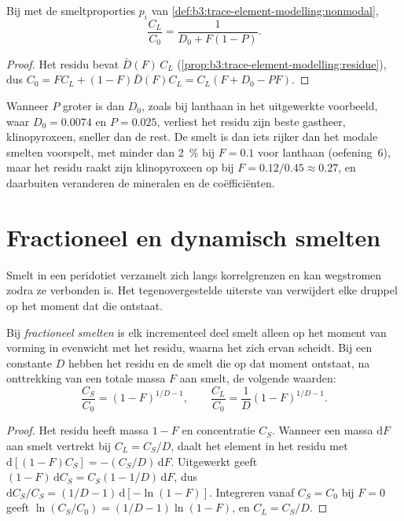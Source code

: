 \begin{proposition}\label{prop:b3:trace-element-modelling:nonmodal}
Bij  met de smeltproporties $p_i$ van \cref{def:b3:trace-element-modelling:nonmodal},
\[
\frac{C_L}{C_0} = \frac{1}{D_0 + F(1 - P)}.
\]
\end{proposition}

\begin{proof}
Het residu bevat $\bar D(F)\,C_L$ (\cref{prop:b3:trace-element-modelling:residue}),
dus $C_0 = FC_L + (1 - F)\bar D(F)C_L = C_L(F + D_0 - PF)$.
\end{proof}

Wanneer $P$ groter is dan $D_0$, zoals bij lanthaan in het uitgewerkte voorbeeld, waar $D_0 =
0.0074$ en $P = 0.025$, verliest het residu zijn beste gastheer, klinopyroxeen, sneller
dan de rest. De smelt is dan iets rijker dan het modale smelten voorspelt,
met minder dan \qty{2}{\percent} bij $F = 0.1$ voor lanthaan (oefening~6), maar het
residu raakt zijn klinopyroxeen op bij $F = 0.12/0.45 \approx 0.27$, en daarbuiten
veranderen de mineralen en de coëfficiënten.

\section{Fractioneel en dynamisch smelten}\label{sec:b3:trace-element-modelling:fractional}

Smelt in een peridotiet verzamelt zich langs korrelgrenzen en kan wegstromen zodra ze
verbonden is. Het tegenovergestelde uiterste van  verwijdert elke druppel
op het moment dat die ontstaat.

\begin{theorem}\label{thm:b3:trace-element-modelling:fractional}
Bij \emph{fractioneel smelten} is elk incrementeel deel smelt
alleen op het moment van vorming in evenwicht met het residu, waarna het
zich ervan scheidt. Bij een constante $D$ hebben het residu en de smelt die op dat moment
ontstaat, na onttrekking van een totale massa $F$ aan smelt, de volgende waarden:
\[
\frac{C_S}{C_0} = (1 - F)^{1/D - 1}, \qquad
\frac{C_L}{C_0} = \frac{1}{D}(1 - F)^{1/D - 1}.
\]
\end{theorem}

\begin{proof}
Het residu heeft massa $1 - F$ en concentratie $C_S$. Wanneer een massa
$\mathrm dF$ aan smelt vertrekt bij $C_L = C_S/D$, daalt het element in het residu
met $\mathrm d[(1 - F)C_S] = -(C_S/D)\,\mathrm dF$. Uitgewerkt
geeft $(1 - F)\,\mathrm dC_S = C_S(1 - 1/D)\,\mathrm dF$, dus
$\mathrm dC_S/C_S = (1/D - 1)\,\mathrm d[-\ln(1 - F)]$. Integreren vanaf
$C_S = C_0$ bij $F = 0$ geeft $\ln(C_S/C_0) = (1/D - 1)\ln(1 - F)$, en
$C_L = C_S/D$.
\end{proof}

